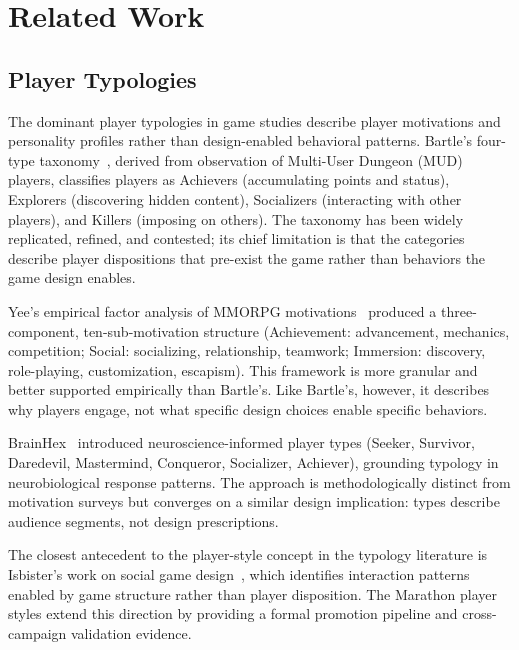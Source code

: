 
\section{Related Work}
\label{sec:related}

\subsection{Player Typologies}

The dominant player typologies in game studies describe player motivations and
personality profiles rather than design-enabled behavioral patterns. Bartle's
four-type taxonomy~\cite{bartle1996hearts}, derived from observation of Multi-User
Dungeon (MUD) players, classifies players as Achievers (accumulating points and status),
Explorers (discovering hidden content), Socializers (interacting with other players),
and Killers (imposing on others). The taxonomy has been widely replicated, refined,
and contested; its chief limitation is that the categories describe player dispositions
that pre-exist the game rather than behaviors the game design enables.

Yee's empirical factor analysis of MMORPG motivations~\cite{yee2006motivations}
produced a three-component, ten-sub-motivation structure (Achievement: advancement,
mechanics, competition; Social: socializing, relationship, teamwork; Immersion:
discovery, role-playing, customization, escapism). This framework is more granular
and better supported empirically than Bartle's. Like Bartle's, however, it describes
why players engage, not what specific design choices enable specific behaviors.

BrainHex~\cite{nacke2011brainhex} introduced neuroscience-informed player types
(Seeker, Survivor, Daredevil, Mastermind, Conqueror, Socializer, Achiever), grounding
typology in neurobiological response patterns. The approach is methodologically
distinct from motivation surveys but converges on a similar design implication:
types describe audience segments, not design prescriptions.

The closest antecedent to the player-style concept in the typology literature is
Isbister's work on social game design~\cite{isbister2006better}, which identifies
interaction patterns enabled by game structure rather than player disposition. The
Marathon player styles extend this direction by providing a formal promotion pipeline
and cross-campaign validation evidence.


